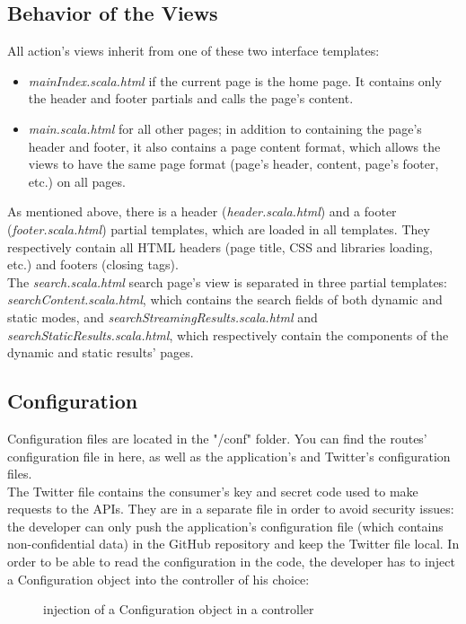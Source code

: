 \documentclass[a4paper,11pt]{report}
\begin{document}
\subsection{Behavior of the Views}
All action's views inherit from one of these two interface templates:
\begin{itemize}
	\item \emph{mainIndex.scala.html} if the current page is the home page. It contains only the header and footer partials and calls the page's content.
	 \item \emph{main.scala.html} for all other pages; in addition to containing the page's header and footer, it also contains a page content format, which allows the views to have the same page format (page's header, content, page's footer, etc.) on all pages.
\end{itemize}
As mentioned above, there is a header (\emph{header.scala.html}) and a footer (\emph{footer.scala.html}) partial templates, which are loaded in all templates. They respectively contain all HTML headers (page title, CSS and libraries loading, etc.) and footers (closing tags).\\

The \emph{search.scala.html} search page's view is separated in three partial templates: \emph{searchContent.scala.html}, which contains the search fields of both dynamic and static modes, and \emph{searchStreamingResults.scala.html} and \emph{searchStaticResults.scala.html}, which respectively contain the components of the dynamic and static results' pages.
\bigskip

\subsection{Configuration}
Configuration files are located in the "/conf" folder. You can find the routes' configuration file in here, as well as the application's and Twitter's configuration files.\\

The Twitter file contains the consumer's key and secret code used to make requests to the APIs. They are in a separate file in order to avoid security issues: the developer can only push the application's configuration file (which contains non-confidential data) in the GitHub repository and keep the Twitter file local.
\newpage
In order to be able to read the configuration in the code, the developer has to inject a Configuration object into the controller of his choice:
\begin{figure}[H]
\vspace{-5pt}
\begin{center}
\vspace{-20pt}
\caption{injection of a Configuration object in a controller}
\end{center}
\end{figure}
\end{document}
